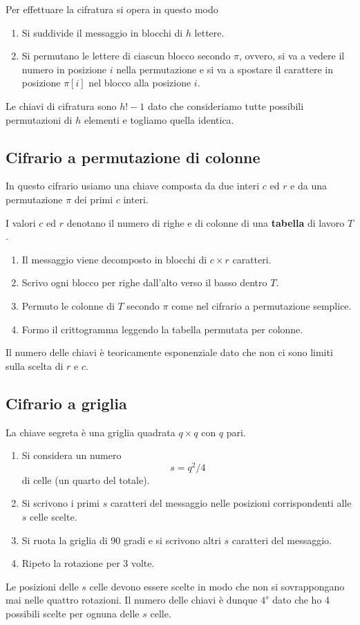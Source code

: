 Per effettuare la cifratura si opera in questo modo
\begin{enumerate}
	\item Si suddivide il messaggio in blocchi di $h$ lettere.
	\item Si permutano le lettere di ciascun blocco secondo $\pi$, ovvero, si va a vedere il numero in posizione $i$
	      nella permutazione e si va a spostare il carattere in posizione $\pi[i]$ nel blocco alla posizione $i$.
\end{enumerate}
Le chiavi di cifratura sono $h! - 1$ dato che consideriamo tutte possibili permutazioni di $h$ elementi e togliamo quella
identica.

\subsection{Cifrario a permutazione di colonne}
In questo cifrario usiamo una chiave composta da due interi $c$ ed $r$ e da una permutazione $\pi$ dei primi $c$ interi.

I valori $c$ ed $r$ denotano il numero di righe e di colonne di una \textbf{tabella} di lavoro $T$.

\begin{enumerate}
	\item Il messaggio viene decomposto in blocchi di $c \times r$ caratteri.
	\item Scrivo ogni blocco per righe dall'alto verso il basso dentro $T$.
	\item Permuto le colonne di $T$ secondo $\pi$ come nel cifrario a permutazione semplice.
	\item Formo il crittogramma leggendo la tabella permutata per colonne.
\end{enumerate}
Il numero delle chiavi \`e teoricamente esponenziale dato che non ci sono limiti sulla scelta di $r$ e $c$.

\subsection{Cifrario a griglia}
La chiave segreta \`e una griglia quadrata $q \times q$ con $q$ pari.
\begin{enumerate}
	\item Si considera un numero
	      \[ s = q^2 / 4 \]
	      di celle (un quarto del totale).
	\item Si scrivono i primi $s$ caratteri del messaggio nelle posizioni corrispondenti alle $s$ celle scelte.
	\item Si ruota la griglia di 90 gradi e si scrivono altri $s$ caratteri del messaggio.
	\item Ripeto la rotazione per 3 volte.
\end{enumerate}
Le posizioni delle $s$ celle devono essere scelte in modo che non si sovrappongano mai nelle quattro rotazioni. Il numero
delle chiavi \`e dunque $4^s$ dato che ho 4 possibili scelte per ognuna delle $s$ celle.


